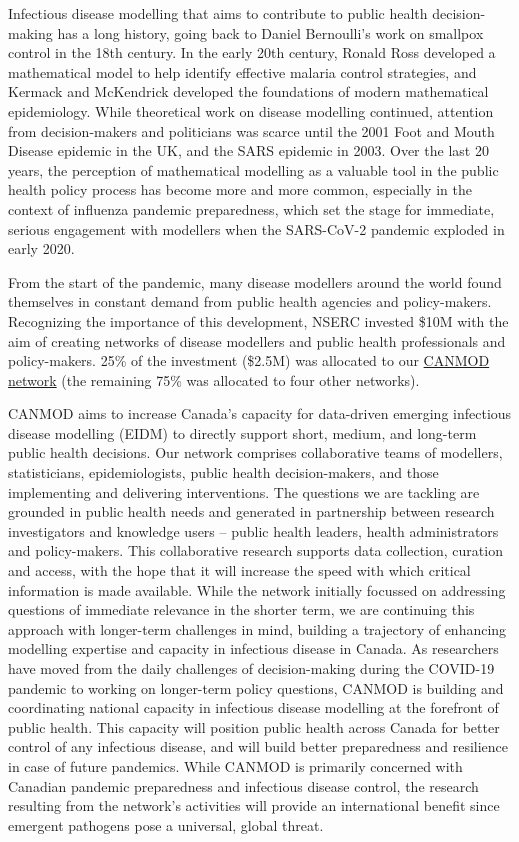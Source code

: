 
Infectious disease modelling that aims to contribute to public health
decision-making has a long history, going back to Daniel Bernoulli’s
work on smallpox control in the 18th century.  In the early 20th
century, Ronald Ross developed a mathematical model to help identify
effective malaria control strategies, and Kermack and McKendrick
developed the foundations of modern mathematical epidemiology.  While
theoretical work on disease modelling continued, attention from
decision-makers and politicians was scarce until the 2001 Foot and
Mouth Disease epidemic in the UK, and the SARS epidemic in 2003.  Over
the last 20 years, the perception of mathematical modelling as a
valuable tool in the public health policy process has become more and
more common, especially in the context of influenza pandemic
preparedness, which set the stage for immediate, serious engagement
with modellers when the SARS-CoV-2 pandemic exploded in early 2020.

From the start of the pandemic, many disease modellers around the
world found themselves in constant demand from public health agencies
and policy-makers.  Recognizing the importance of this development,
NSERC invested \$10M with the aim of creating networks of disease
modellers and public health professionals and policy-makers.  25\% of
the investment (\$2.5M) was allocated to our
\href{https://canmod.net/}{CANMOD network} (the remaining 75\% was
allocated to four other networks).

CANMOD aims to increase Canada’s capacity for data-driven emerging
infectious disease modelling (EIDM) to directly support short, medium,
and long-term public health decisions. Our network comprises
collaborative teams of modellers, statisticians, epidemiologists,
public health decision-makers, and those implementing and delivering
interventions. The questions we are tackling are grounded in public
health needs and generated in partnership between research
investigators and knowledge users -- public health leaders, health
administrators and policy-makers. This collaborative research supports
data collection, curation and access, with the hope that it will
increase the speed with which critical information is made available.
While the network initially focussed on addressing questions of
immediate relevance in the shorter term, we are continuing this
approach with longer-term challenges in mind, building a trajectory of
enhancing modelling expertise and capacity in infectious disease in
Canada. As researchers have moved from the daily challenges of
decision-making during the COVID-19 pandemic to working on longer-term
policy questions, CANMOD is building and coordinating national
capacity in infectious disease modelling at the forefront of public
health. This capacity will position public health across Canada for
better control of any infectious disease, and will build better
preparedness and resilience in case of future pandemics. While CANMOD
is primarily concerned with Canadian pandemic preparedness and
infectious disease control, the research resulting from the network’s
activities will provide an international benefit since emergent
pathogens pose a universal, global threat.


